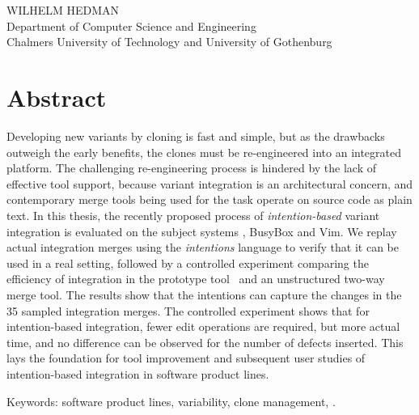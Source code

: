 \fullt\\
\subt\\
WILHELM HEDMAN\\
Department of Computer Science and Engineering\\
Chalmers University of Technology and University of Gothenburg\setlength{\parskip}{0.5cm}

\thispagestyle{plain}			%
\setlength{\parskip}{0pt plus 1.0pt}
\section*{Abstract}
Developing new variants by cloning is fast and simple, but as the drawbacks outweigh the early benefits, the clones must be re-engineered into an integrated platform. The challenging re-engineering process is hindered by the lack of effective tool support, because variant integration is an architectural concern, and contemporary merge tools being used for the task operate on source code as plain text. In this thesis, the recently proposed process of \textit{intention-based} variant integration is evaluated on the subject systems \marlin, BusyBox and Vim. We replay actual integration merges using the \textit{intentions} language to verify that it can be used in a real setting, followed by a controlled experiment comparing the efficiency of integration in the prototype tool \tooln~and an unstructured two-way merge tool. The results show that the intentions can capture the changes in the 35 sampled integration merges. The controlled experiment shows that for intention-based integration, fewer edit operations are required, but more actual time, and no difference can be observed for the number of defects inserted. This lays the foundation for tool improvement and subsequent user studies of intention-based integration in software product lines.


\vfill
Keywords: software product lines, variability, clone management, .

\newpage				%
\thispagestyle{empty}
\mbox{}